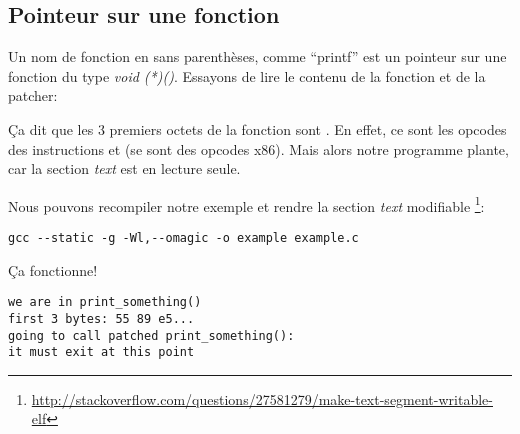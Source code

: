 \subsection{Pointeur sur une fonction}

Un nom de fonction en \CCpp sans parenthèses, comme ``printf'' est un pointeur sur
une fonction du type \emph{void (*)()}.
Essayons de lire le contenu de la fonction et de la patcher:



Ça dit que les 3 premiers octets de la fonction sont .
En effet, ce sont les opcodes des instructions  et 
(se sont des opcodes x86).
Mais alors notre programme plante, car la section \emph{text} est en lecture seule.

Nous pouvons recompiler notre exemple et rendre la section \emph{text} modifiable
\footnote{\url{http://stackoverflow.com/questions/27581279/make-text-segment-writable-elf}}:

\begin{lstlisting}
gcc --static -g -Wl,--omagic -o example example.c
\end{lstlisting}

Ça fonctionne!

\begin{lstlisting}
we are in print_something()
first 3 bytes: 55 89 e5...
going to call patched print_something():
it must exit at this point
\end{lstlisting}

